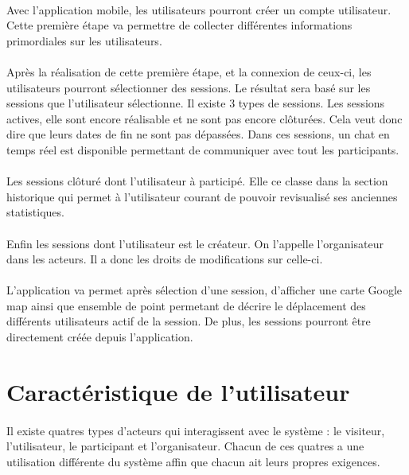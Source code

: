 \documentclass[titlepage, 12pt]{report}
\begin{document}
\paragraph{}Avec l'application mobile, les utilisateurs pourront créer un compte utilisateur. Cette première étape va permettre de collecter différentes informations primordiales sur les utilisateurs. 

\paragraph{}Après la réalisation de cette première étape, et la connexion de ceux-ci, les utilisateurs pourront sélectionner des sessions. Le résultat sera basé sur les sessions que l'utilisateur sélectionne. Il existe 3 types de sessions. Les sessions actives, elle sont encore réalisable et ne sont pas encore clôturées. Cela veut donc dire que leurs dates de fin ne sont pas dépassées. Dans ces sessions, un chat en temps réel est disponible permettant de communiquer avec tout les participants.
\paragraph{}Les sessions clôturé dont l'utilisateur à participé. Elle ce classe dans la section historique qui permet à l'utilisateur courant de pouvoir revisualisé ses anciennes statistiques.
\paragraph{}Enfin les sessions dont l'utilisateur est le créateur. On l'appelle l'organisateur dans les acteurs. Il a donc les droits de modifications sur celle-ci.

\paragraph{}L'application va permet après sélection d'une session, d'afficher une carte Google map ainsi que ensemble de point permetant de décrire le déplacement des différents utilisateurs actif de la session.
De plus, les sessions pourront être directement créée depuis l'application.

\section{Caractéristique de l'utilisateur}

\paragraph{}Il existe quatres types d'acteurs qui interagissent avec le système : le visiteur, l'utilisateur, le participant et l'organisateur. Chacun de ces quatres a une utilisation différente du système affin que chacun ait leurs propres exigences.
\end{document}
